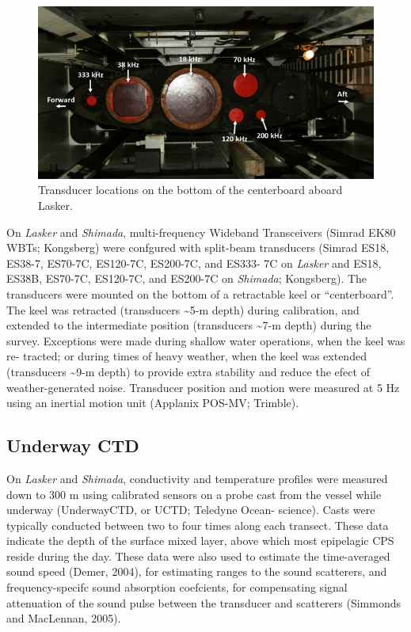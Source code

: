 \documentclass[
  letterpaper,
  oneside,
  open=any]{scrbook}
\begin{document}
\begin{figure}[H]

{\centering \includegraphics{content/images/transducers.jpg}

}

\caption{Transducer locations on the bottom of the centerboard aboard
Lasker.}

\end{figure}%

On \emph{Lasker} and \emph{Shimada}, multi-frequency Wideband
Transceivers (Simrad EK80 WBTs; Kongsberg) were confgured with
split-beam transducers (Simrad ES18, ES38-7, ES70-7C, ES120-7C,
ES200-7C, and ES333- 7C on \emph{Lasker} and ES18, ES38B, ES70-7C,
ES120-7C, and ES200-7C on \emph{Shimada}; Kongsberg). The transducers
were mounted on the bottom of a retractable keel or ``centerboard''. The
keel was retracted (transducers \textasciitilde5-m depth) during
calibration, and extended to the intermediate position (transducers
\textasciitilde7-m depth) during the survey. Exceptions were made during
shallow water operations, when the keel was re- tracted; or during times
of heavy weather, when the keel was extended (transducers
\textasciitilde9-m depth) to provide extra stability and reduce the
efect of weather-generated noise. Transducer position and motion were
measured at 5 Hz using an inertial motion unit (Applanix POS-MV;
Trimble).

\subsection{Underway CTD}\label{underway-ctd}

On \emph{Lasker} and \emph{Shimada}, conductivity and temperature
profiles were measured down to 300 m using calibrated sensors on a probe
cast from the vessel while underway (UnderwayCTD, or UCTD; Teledyne
Ocean- science). Casts were typically conducted between two to four
times along each transect. These data indicate the depth of the surface
mixed layer, above which most epipelagic CPS reside during the day.
These data were also used to estimate the time-averaged sound speed
(Demer, 2004), for estimating ranges to the sound scatterers, and
frequency-specifc sound absorption coefcients, for compensating signal
attenuation of the sound pulse between the transducer and scatterers
(Simmonds and MacLennan, 2005).
\end{document}
